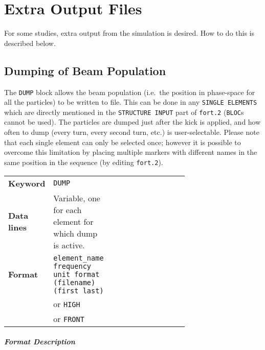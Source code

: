 
\chapter{Extra Output Files} \label{ExtraOutput}

For some studies, extra output from the simulation is desired.
How to do this is described below.

\section{Dumping of Beam Population} \label{sec:DUMP}

The \texttt{DUMP} block allows the beam population (i.e.\ the position in phase-space for all the particles) to be written to file.
This can be done in any \texttt{SINGLE ELEMENTS} which are directly mentioned in the \texttt{STRUCTURE INPUT} part of \texttt{fort.2} (\texttt{BLOC}s cannot be used).
The particles are dumped just after the kick is applied, and how often to dump (every turn, every second turn, etc.) is user-selectable.
Please note that each single element can only be selected once; however it is possible to overcome this limitation by placing multiple markers with different names in the same position in the sequence (by editing \texttt{fort.2}).

\bigskip
\begin{tabular}{@{}llp{0.7\linewidth}}
    \textbf{Keyword}    & \texttt{DUMP} \\
    \textbf{Data lines} & Variable, one for each element for which dump is active. \\
    \textbf{Format}     & \texttt{element\_name frequency unit format (filename) (first last)} \\
                        & or \texttt{HIGH} \\
                        & or \texttt{FRONT}
\end{tabular}

\paragraph{Format Description}~

